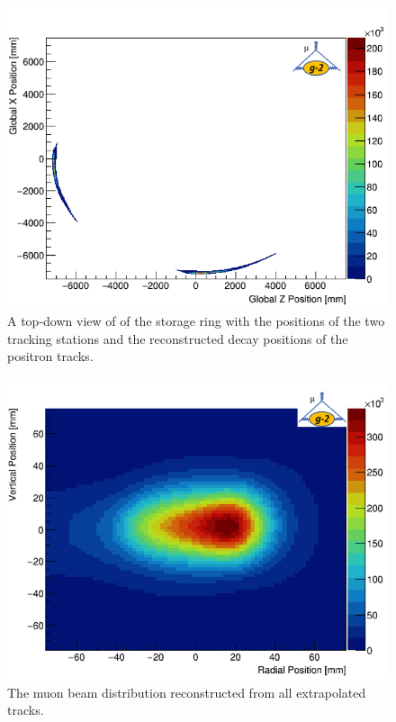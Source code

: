 \begin{figure}[th]
\centering
\includegraphics[scale=0.9]{Figures/trackextrap.png}
\decoRule
\caption{A top-down view of of the storage ring with the positions of the two tracking stations and the reconstructed decay positions of the positron tracks.}
\label{fig:trackextrap}
\end{figure}

\begin{figure}[th]
\centering
\includegraphics{Figures/beamposition.png}
\decoRule
\caption{The muon beam distribution reconstructed from all extrapolated tracks.}
\label{fig:beamposition}
\end{figure}


